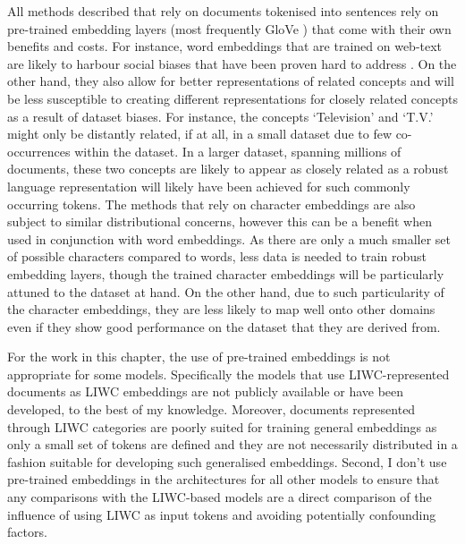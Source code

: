 All methods described that rely on documents tokenised into sentences rely on pre-trained embedding layers (most frequently GloVe \citet{Pennington:2014}) that come with their own benefits and costs. For instance, word embeddings that are trained on web-text are likely to harbour social biases \citep{Bolukbasi:2016} that have been proven hard to address \citep{Gonen:2019}. On the other hand, they also allow for better representations of related concepts and will be less susceptible to creating different representations for closely related concepts as a result of dataset biases. For instance, the concepts `Television' and `T.V.' might only be distantly related, if at all, in a small dataset due to few co-occurrences within the dataset. In a larger dataset, spanning millions of documents, these two concepts are likely to appear as closely related as a robust language representation will likely have been achieved for such commonly occurring tokens.
The methods that rely on character embeddings are also subject to similar distributional concerns, however this can be a benefit when used in conjunction with word embeddings. As there are only a much smaller set of possible characters compared to words, less data is needed to train robust embedding layers, though the trained character embeddings will be particularly attuned to the dataset at hand. On the other hand, due to such particularity of the character embeddings, they are less likely to map well onto other domains even if they show good performance on the dataset that they are derived from.\vspace{5mm}

For the work in this chapter, the use of pre-trained embeddings is not appropriate for some models. Specifically the models that use LIWC-represented documents as LIWC embeddings are not publicly available or have been developed, to the best of my knowledge. Moreover, documents represented through LIWC categories are poorly suited for training general embeddings as only a small set of tokens are defined and they are not necessarily distributed in a fashion suitable for developing such generalised  embeddings. Second, I don't use pre-trained embeddings in the architectures for all other models to ensure that any comparisons with the LIWC-based models are a direct comparison of the influence of using LIWC as input tokens and avoiding potentially confounding factors.


